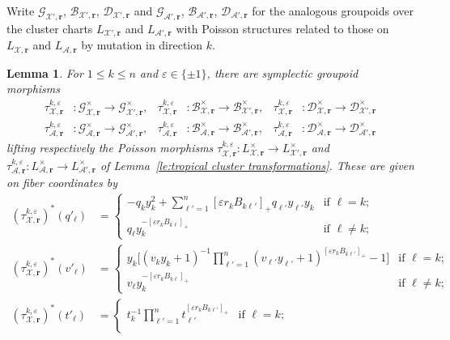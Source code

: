 \documentclass{amsart}
\newtheorem{lemma}[theorem]{Lemma}
\numberwithin{equation}{section}
\newcommand{\bfr}{{\boldsymbol{r}}}
\newcommand{\cA}{\mathcal{A}}
\newcommand{\cB}{\mathcal{B}}
\newcommand{\cD}{\mathcal{D}}
\newcommand{\cG}{\mathcal{G}}
\newcommand{\cX}{\mathcal{X}}
\begin{document}
Write $\cG_{\cX',\bfr}$, $\cB_{\cX',\bfr}$, $\cD_{\cX',\bfr}$ and $\cG_{\cA',\bfr}$, $\cB_{\cA',\bfr}$, $\cD_{\cA',\bfr}$ for the analogous groupoids over the cluster charts $L_{\cX',\bfr}$ and $L_{\cA',\bfr}$ with Poisson structures related to those on $L_{\cX,\bfr}$ and $L_{\cA,\bfr}$ by mutation in direction $k$.
\begin{lemma}
  \label{le:tropical groupoid transformations}
  For $1\le k\le n$ and $\varepsilon\in\{\pm1\}$, there are symplectic groupoid morphisms 
  \begin{align*}
    \tau_{\cX,\bfr}^{k,\varepsilon}&:\cG^\times_{\cX,\bfr}\to\cG^\times_{\cX',\bfr},& \tau_{\cX,\bfr}^{k,\varepsilon}&:\cB^\times_{\cX,\bfr}\to\cB^\times_{\cX',\bfr},& \tau_{\cX,\bfr}^{k,\varepsilon}&:\cD^\times_{\cX,\bfr}\to\cD^\times_{\cX',\bfr}\\
    \tau_{\cA,\bfr}^{k,\varepsilon}&:\cG^\times_{\cA,\bfr}\to\cG^\times_{\cA',\bfr},& \tau_{\cA,\bfr}^{k,\varepsilon}&:\cB^\times_{\cA,\bfr}\to\cB^\times_{\cA',\bfr},& \tau_{\cA,\bfr}^{k,\varepsilon}&:\cD^\times_{\cA,\bfr}\to\cD^\times_{\cA',\bfr}
  \end{align*}
  lifting respectively the Poisson morphisms $\tau_{\cX,\bfr}^{k,\varepsilon}:L^\times_{\cX,\bfr}\to L^\times_{\cX',\bfr}$ and $\tau_{\cA,\bfr}^{k,\varepsilon}:L^\times_{\cA,\bfr}\to L^\times_{\cA',\bfr}$ of Lemma~\ref{le:tropical cluster transformations}.
  These are given on fiber coordinates by
  \begin{align}
    \nonumber
    (\tau_{\cX,\bfr}^{k,\varepsilon})^*(q'_\ell)
    &=\begin{cases} 
      -q_k y_k^2 + \sum\limits_{\ell'=1}^n [\varepsilon r_k B_{k\ell'}]_+ q_{\ell'} y_{\ell'} y_k & \text{if $\ell=k$;}\\ 
      q_\ell y_k^{-[\varepsilon r_k B_{k\ell}]_+} & \text{if $\ell\ne k$;}
    \end{cases}\\
    \nonumber
    (\tau_{\cX,\bfr}^{k,\varepsilon})^*(v'_\ell)
    &=\begin{cases} 
      y_k\Big[(v_k y_k + 1)^{-1}\prod\limits_{\ell'=1}^n (v_{\ell'} y_{\ell'} + 1)^{[\varepsilon r_k B_{k\ell'}]_+} -1\Big] & \text{if $\ell=k$;}\\
      v_\ell y_k^{-[\varepsilon r_k B_{k\ell}]_+} & \text{if $\ell\ne k$;}
    \end{cases}\\
    \nonumber
    (\tau_{\cX,\bfr}^{k,\varepsilon})^*(t'_\ell)
    &=\begin{cases} 
      t_k^{-1}\prod\limits_{\ell'=1}^n t_{\ell'}^{[\varepsilon r_k B_{k\ell'}]_+} & \text{if $\ell=k$;}\\

\end{cases}
\end{align}
\end{lemma}
\end{document}
